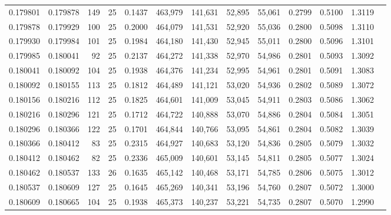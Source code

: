 \begin{tabular}{rrrrrrrrrrrrr}
0.179801 & 0.179878 &   149 &  25 &                                     0.1437 & 463,979 & 141,631 &  52,895 &  55,061 & 0.2799 & 0.5100 & 1.3119 \\
0.179878 & 0.179929 &   100 &  25 &                                     0.2000 & 464,079 & 141,531 &  52,920 &  55,036 & 0.2800 & 0.5098 & 1.3110 \\
0.179930 & 0.179984 &   101 &  25 &                                     0.1984 & 464,180 & 141,430 &  52,945 &  55,011 & 0.2800 & 0.5096 & 1.3101 \\
0.179985 & 0.180041 &    92 &  25 &                                     0.2137 & 464,272 & 141,338 &  52,970 &  54,986 & 0.2801 & 0.5093 & 1.3092 \\
0.180041 & 0.180092 &   104 &  25 &                                     0.1938 & 464,376 & 141,234 &  52,995 &  54,961 & 0.2801 & 0.5091 & 1.3083 \\
0.180092 & 0.180155 &   113 &  25 &                                     0.1812 & 464,489 & 141,121 &  53,020 &  54,936 & 0.2802 & 0.5089 & 1.3072 \\
0.180156 & 0.180216 &   112 &  25 &                                     0.1825 & 464,601 & 141,009 &  53,045 &  54,911 & 0.2803 & 0.5086 & 1.3062 \\
0.180216 & 0.180296 &   121 &  25 &                                     0.1712 & 464,722 & 140,888 &  53,070 &  54,886 & 0.2804 & 0.5084 & 1.3051 \\
0.180296 & 0.180366 &   122 &  25 &                                     0.1701 & 464,844 & 140,766 &  53,095 &  54,861 & 0.2804 & 0.5082 & 1.3039 \\
0.180366 & 0.180412 &    83 &  25 &                                     0.2315 & 464,927 & 140,683 &  53,120 &  54,836 & 0.2805 & 0.5079 & 1.3032 \\
0.180412 & 0.180462 &    82 &  25 &                                     0.2336 & 465,009 & 140,601 &  53,145 &  54,811 & 0.2805 & 0.5077 & 1.3024 \\
0.180462 & 0.180537 &   133 &  26 &                                     0.1635 & 465,142 & 140,468 &  53,171 &  54,785 & 0.2806 & 0.5075 & 1.3012 \\
0.180537 & 0.180609 &   127 &  25 &                                     0.1645 & 465,269 & 140,341 &  53,196 &  54,760 & 0.2807 & 0.5072 & 1.3000 \\
0.180609 & 0.180665 &   104 &  25 &                                     0.1938 & 465,373 & 140,237 &  53,221 &  54,735 & 0.2807 & 0.5070 & 1.2990 \\

\end{tabular}
